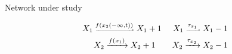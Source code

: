\documentclass{beamer}
\begin{document}
\begin{textblock}{5}
\begin{block}{Network under study}
\begin{figure}
    \label{fig:demon} 
    \end{figure}

    \begin{eqnarray*}
        \tiny
            X_1 \xrightarrow{f(x_2(-\infty,t))} X_1 + 1 \qquad X_1 \xrightarrow{\tau_{x_1}} X_1 -1 \\
            X_2 \xrightarrow{f(x_1)} X_2 + 1 \qquad X_2 \xrightarrow{\tau_{x_2}} X_2 - 1
    \end{eqnarray*}

   
    \end{block}

\end{textblock}
\end{document}
